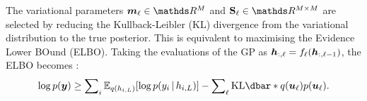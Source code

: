 %
%
The variational parameters $\vm_\ell \in \Reals^M$ and $\MS_\ell \in \Reals^{M \times M}$ are selected by reducing the Kullback-Leibler (KL) divergence from the variational distribution to the true posterior. This is equivalent to maximising the Evidence Lower BOund (ELBO). Taking the evaluations of the GP as $\bm{h}_{:, \ell} = f_\ell(\bm{h}_{:, \ell-1})$, the ELBO becomes \citep{salimbeni2017doubly}:
\begin{equation}
\label{eq:dgp-elbo}
\log p(\vy) \ge \sum\nolimits_i \Exp{q(h_{i, L})}{\log p(y_i \given h_{i, L})} - \sum\nolimits_{\ell} \KL{q(\vu_\ell)}{p(\vu_\ell)}.
\end{equation}

